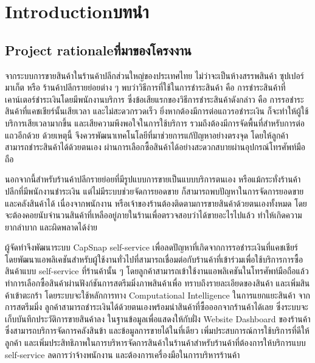 \chapter{\ifenglish Introduction\else บทนำ\fi}

\section{\ifenglish Project rationale\else ที่มาของโครงงาน\fi}
\par จากระบบการขายสินค้าในร้านค้าปลีกส่วนใหญ่ของประเทศไทย ไม่ว่าจะเป็นห้างสรรพสินค้า ซุปเปอร์มาเก็ต หรือ
ร้านค้าปลีกรายย่อยต่าง ๆ พบว่าวิธีการที่ใช้ในการชำระสินค้า คือ การชำระสินค้าที่เคาน์เตอร์ชำระเงินโดยมีพนักงานบริการ
ซึ่งข้อเสียแรกของวิธีการชำระสินค้าดังกล่าว คือ การรอชำระสินค้าที่แคชเชียร์นั้นเสียเวลา และไม่สะดวกรวดเร็ว
ยิ่งหากต้องมีการต่อแถวรอชำระเงิน ก็จะทำให้ผู้ใช้บริการเสียเวลามากขึ้น และเสียความพึงพอใจในการใช้บริการ
รวมถึงต้องมีการจัดพื้นที่สำหรับการต่อแถวอีกด้วย ด้วยเหตุนี้ จึงควรพัฒนาเทคโนโลยีที่มาช่วยการแก้ปัญหาอย่างตรงจุด
โดยให้ลูกค้าสามารถชำระสินค้าได้ด้วยตนเอง ผ่านการเลือกซื้อสินค้าได้อย่างสะดวกสบายผ่านอุปกรณ์โทรศัพท์มือถือ

นอกจากนี้สำหรับร้านค้าปลีกรายย่อยที่มีรูปแบบการขายเป็นแบบบริการตนเอง หรือแม้กระทั่งร้านค้าปลีกที่มีพนักงานชำระเงิน
แต่ไม่มีระบบช่วยจัดการยอดขาย ก็สามารถพบปัญหาในการจัดการยอดขาย และคลังสินค้าได้ เนื่องจากพนักงาน
หรือเจ้าของร้านต้องติดตามการขายสินค้าด้วยตนเองทั้งหมด โดยจะต้องคอยนับจํานวนสินค้าที่เหลืออยู่ภายในร้านเพื่อตรวจสอบว่าได้ขายอะไรไปแล้ว
ทำให้เกิดความยากลำบาก และผิดพลาดได้ง่าย

ผู้จัดทําจึงพัฒนาระบบ CapSnap self-service เพื่อลดปัญหาที่เกิดจากการรอชำระเงินที่แคชเชียร์
โดยพัฒนาแอพลิเคชันสำหรับผู้ใช้งานทั่วไปที่สามารถเชื่อมต่อกับร้านค้าที่เข้าร่วมเพื่อใช้บริการการซื้อสินค้าแบบ self-service
ที่ร้านค้านั้น ๆ โดยลูกค้าสามารถเข้าใช้งานแอพลิเคชันในโทรศัพท์มือถือแล้วทำการเลือกซื้อสินค้าผ่านฟังก์ชันการสตรีมมิ่งภาพสินค้าเพื่อ
ทราบถึงรายละเอียดของสินค้า และเพิ่มสินค้าเข้าตะกร้า โดยระบบจะใช้หลักการทาง Computational Intelligence ในการแยกแยะสินค้า
จากการสตรีมมิ่ง ลูกค้าสามารถชำระเงินได้ด้วยตนเองพร้อมนำสินค้าที่ซื้อออกจากร้านค้าได้เลย ซึ่งระบบจะเก็บบันทึกประวัติการขายสินค้าลง
ในฐานข้อมูลเพื่อแสดงให้กับฝั่ง Website Dashboard ของร้านค้าซึ่งสามารถบริการจัดการคลังสินข้า และข้อมูลการขายได้ในที่เดียว
เพิ่มประสบการณ์การใช้บริการที่ดีให้ลูกค้า และเพิ่มประสิทธิภาพในการบริหารจัดการสินค้าในร้านค้าสำหรับร้านค้าที่ต้องการให้บริการแบบ
self-service ลดการว่าจ้างพนักงาน และต้องการเครื่องมือในการบริหารร้านค้า



